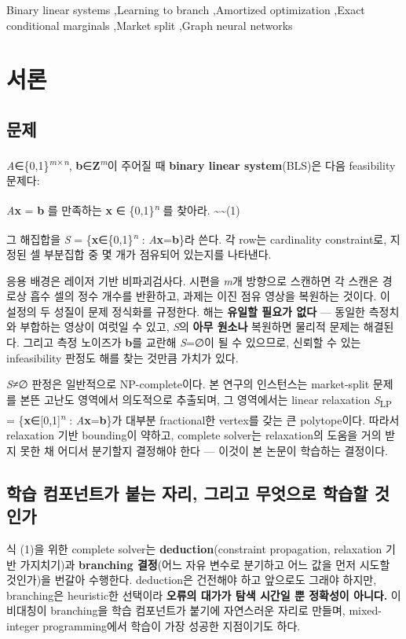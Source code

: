 \documentclass[final,5p,twocolumn]{elsarticle}
\begin{document}
\begin{frontmatter}
\begin{keyword}
Binary linear systems \sep Learning to branch \sep Amortized optimization \sep Exact conditional marginals \sep Market split \sep Graph neural networks
\end{keyword}

\end{frontmatter}

\section{서론}
\subsection{문제}
\textit{A}∈\{0,1\}\textsuperscript{\textit{m}×\textit{n}}, \textbf{b}∈\textbf{Z}\textsuperscript{\textit{m}}이 주어질 때 \textbf{binary linear system}(BLS)은 다음 feasibility 문제다:

\begin{center}\small \textit{A}\textbf{x} = \textbf{b} 를 만족하는 \textbf{x} ∈ \{0,1\}\textsuperscript{\textit{n}} 를 찾아라.  \textasciitilde{}\textasciitilde{}(1)\end{center}
그 해집합을 \textit{S} = \{\textbf{x}∈\{0,1\}\textsuperscript{\textit{n}} : \textit{A}\textbf{x}=\textbf{b}\}라 쓴다. 각 row는 cardinality constraint로, 지정된 셀 부분집합 중 몇 개가 점유되어 있는지를 나타낸다.

응용 배경은 레이저 기반 비파괴검사다. 시편을 \textit{m}개 방향으로 스캔하면 각 스캔은 경로상 흡수 셀의 정수 개수를 반환하고, 과제는 이진 점유 영상을 복원하는 것이다. 이 설정의 두 성질이 문제 정식화를 규정한다. 해는 \textbf{유일할 필요가 없다} — 동일한 측정치와 부합하는 영상이 여럿일 수 있고, \textit{S}의 \textbf{아무 원소나} 복원하면 물리적 문제는 해결된다. 그리고 측정 노이즈가 \textbf{b}를 교란해 \textit{S}=∅이 될 수 있으므로, 신뢰할 수 있는 infeasibility 판정도 해를 찾는 것만큼 가치가 있다.

\textit{S}≠∅ 판정은 일반적으로 NP-complete이다. 본 연구의 인스턴스는 market-split 문제를 본뜬 고난도 영역에서 의도적으로 추출되며, 그 영역에서는 linear relaxation \textit{S}\textsubscript{LP} = \{\textbf{x}∈[0,1]\textsuperscript{\textit{n}} : \textit{A}\textbf{x}=\textbf{b}\}가 대부분 fractional한 vertex를 갖는 큰 polytope이다. 따라서 relaxation 기반 bounding이 약하고, complete solver는 relaxation의 도움을 거의 받지 못한 채 어디서 분기할지 결정해야 한다 — 이것이 본 논문이 학습하는 결정이다.

\subsection{학습 컴포넌트가 붙는 자리, 그리고 무엇으로 학습할 것인가}
식 (1)을 위한 complete solver는 \textbf{deduction}(constraint propagation, relaxation 기반 가지치기)과 \textbf{branching 결정}(어느 자유 변수로 분기하고 어느 값을 먼저 시도할 것인가)을 번갈아 수행한다. deduction은 건전해야 하고 앞으로도 그래야 하지만, branching은 heuristic한 선택이라 \textbf{오류의 대가가 탐색 시간일 뿐 정확성이 아니다.} 이 비대칭이 branching을 학습 컴포넌트가 붙기에 자연스러운 자리로 만들며, mixed-integer programming에서 학습이 가장 성공한 지점이기도 하다.
\end{document}
